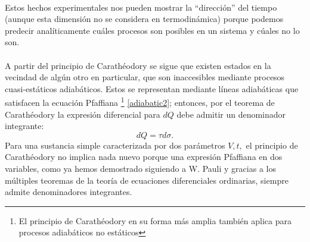 \documentclass{article}
\theoremstyle{definition} \newtheorem{defi}{Definici\'on}
\theoremstyle{definition} \newtheorem{teo}{Teorema}
\theoremstyle{definition} \newtheorem{cor}{Corolario}
\begin{document}
\paragraph{}
Estos hechos experimentales nos pueden mostrar la ``direcci\'on'' del tiempo (aunque esta dimensi\'on no se considera en termodin\'amica) porque podemos predecir anal\'iticamente cu\'ales procesos son posibles en un sistema y c\'uales no lo son.
\paragraph{}
A partir del principio de Carath\'eodory se sigue que existen estados en la vecindad de alg\'un otro en particular, que son inaccesibles mediante procesos cuasi-est\'aticos adiab\'aticos. Estos se representan mediante l\'ineas adiab\'aticas que satisfacen la ecuaci\'on Pfaffiana \footnote{El principio de Carath\'eodory en su forma m\'as amplia tambi\'en aplica para procesos adiab\'aticos no est\'aticos} \eqref{adiabatic2}; entonces, por el teorema de Carath\'eodory la expresi\'on diferencial para $dQ$ debe admitir un denominador integrante:
\begin{equation}\label{facin}
dQ=\tau d\sigma.
\end{equation}
Para una sustancia simple caracterizada por dos par\'ametros $V,t,$ el principio de Carath\'eodory no implica nada nuevo porque una expresi\'on Pfaffiana en dos variables, como ya hemos demostrado siguiendo a W. Pauli y gracias a los m\'ultiples teoremas de la teor\'ia de ecuaciones diferenciales ordinarias, siempre admite denominadores integrantes.
\end{document}
